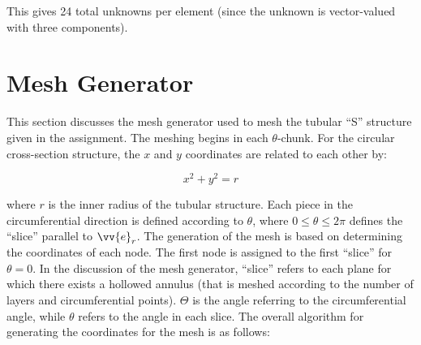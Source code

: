 \documentclass[10pt]{article}
\begin{document}
This gives 24 total unknowns per element (since the unknown is vector-valued with three components). 


\section{Mesh Generator}

This section discusses the mesh generator used to mesh the tubular ``S'' structure given in the assignment. The meshing begins in each \(\theta\)-chunk. For the circular cross-section structure, the \(x\) and \(y\) coordinates are related to each other by:

\begin{equation}
\label{eq:xy}
x^2+y^2=r
\end{equation}

where \(r\) is the inner radius of the tubular structure. Each piece in the circumferential direction is defined according to \(\theta\), where \(0\leq\theta\leq2\pi\) defines the ``slice'' parallel to \(\vv{e}_r\). The generation of the mesh is based on determining the coordinates of each node. The first node is assigned to the first ``slice'' for \(\theta=0\). In the discussion of the mesh generator, ``slice'' refers to each plane for which there exists a hollowed annulus (that is meshed according to the number of layers and circumferential points). \(\Theta\) is the angle referring to the circumferential angle, while \(\theta\) refers to the angle in each slice. The overall algorithm for generating the coordinates for the mesh is as follows:
\end{document}
